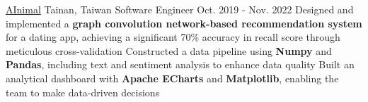 \resumeExpEntry
{\href{https://ainimal.io}{AInimal}}
{Tainan, Taiwan}
{Software Engineer}
{Oct. 2019 - Nov. 2022}
{
  \resumeItemListStart
    \resumeItem
    {Designed and implemented a \textbf{graph convolution network-based recommendation system} for a dating app, achieving a significant 70\% accuracy in recall score through meticulous cross-validation}
    \resumeItem
    {Constructed a data pipeline using \textbf{Numpy} and \textbf{Pandas}, including text and sentiment analysis to enhance data quality}
    \resumeItem
    {Built an analytical dashboard with \textbf{Apache ECharts} and \textbf{Matplotlib}, enabling the team to make data-driven decisions}
  \resumeItemListEnd
}

